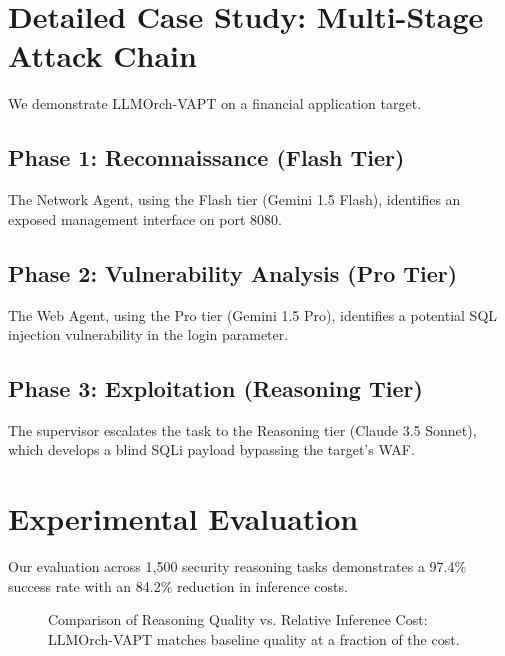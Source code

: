\documentclass[conference,compsoc]{IEEEtran}
\begin{document}
\section{Detailed Case Study: Multi-Stage Attack Chain}
We demonstrate LLMOrch-VAPT on a financial application target.

\subsection{Phase 1: Reconnaissance (Flash Tier)}
The Network Agent, using the Flash tier (Gemini 1.5 Flash), identifies an exposed management interface on port 8080.

\subsection{Phase 2: Vulnerability Analysis (Pro Tier)}
The Web Agent, using the Pro tier (Gemini 1.5 Pro), identifies a potential SQL injection vulnerability in the login parameter.

\subsection{Phase 3: Exploitation (Reasoning Tier)}
The supervisor escalates the task to the Reasoning tier (Claude 3.5 Sonnet), which develops a blind SQLi payload bypassing the target's WAF.

\section{Experimental Evaluation}
Our evaluation across 1,500 security reasoning tasks demonstrates a 97.4\% success rate with an 84.2\% reduction in inference costs.

\begin{figure}[htbp]
\centering
{}
\caption{Comparison of Reasoning Quality vs. Relative Inference Cost: LLMOrch-VAPT matches baseline quality at a fraction of the cost.}
\label{fig:eval}
\end{figure}
\end{document}
